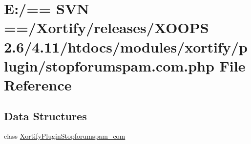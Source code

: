 \hypertarget{stopforumspam_8com_8php}{\section{E\-:/== S\-V\-N ==/\-Xortify/releases/\-X\-O\-O\-P\-S 2.6/4.11/htdocs/modules/xortify/plugin/stopforumspam.com.\-php File Reference}
\label{stopforumspam_8com_8php}
}
\subsection*{Data Structures}
\begin{DoxyCompactItemize}
\item 
class \hyperlink{class_xortify_plugin_stopforumspam__com}{Xortify\-Plugin\-Stopforumspam\-\_\-com}
\end{DoxyCompactItemize}
